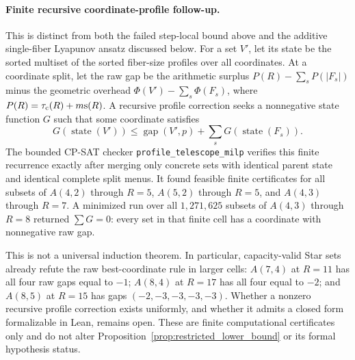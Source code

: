 \paragraph{Finite recursive coordinate-profile follow-up.}
This is distinct from both the failed step-local bound above and the
additive single-fiber Lyapunov ansatz discussed below.  For a set $V'$, let
its state be the sorted multiset of the sorted fiber-size profiles over all
coordinates.  At a coordinate split, let the raw gap be the arithmetic
surplus $P(R)-\sum_s P(|F_s|)$ minus the geometric overhead
$\Phi(V')-\sum_s\Phi(F_s)$, where $P(R)=\tau_{\mathrm{c}}(R)+m\mathrm{s}(R)$.  A
recursive profile correction seeks a nonnegative state function $G$ such
that some coordinate satisfies
\[
 G(\operatorname{state}(V'))
 \le \operatorname{gap}(V',p)+\sum_sG(\operatorname{state}(F_s)).
\]
The bounded CP-SAT checker \texttt{profile\_telescope\_milp} verifies this
finite recurrence exactly after merging only concrete sets with identical
parent state and identical complete split menus.  It found feasible finite
certificates for all subsets of $A(4,2)$ through $R=5$, $A(5,2)$ through
$R=5$, and $A(4,3)$ through $R=7$.  A minimized run over all $1{,}271{,}625$
subsets of $A(4,3)$ through $R=8$ returned $\sum G=0$: every set in that
finite cell has a coordinate with nonnegative raw gap.

This is not a universal induction theorem.  In particular, capacity-valid
Star sets already refute the raw best-coordinate rule in larger cells:
$A(7,4)$ at $R=11$ has all four raw gaps equal to $-1$; $A(8,4)$ at
$R=17$ has all four equal to $-2$; and $A(8,5)$ at $R=15$ has gaps
$(-2,-3,-3,-3,-3)$.  Whether a nonzero recursive profile correction exists
uniformly, and whether it admits a closed form formalizable in Lean, remains
open.  These are finite computational certificates only and do not alter
Proposition~\ref{prop:restricted_lower_bound} or its formal hypothesis status.

